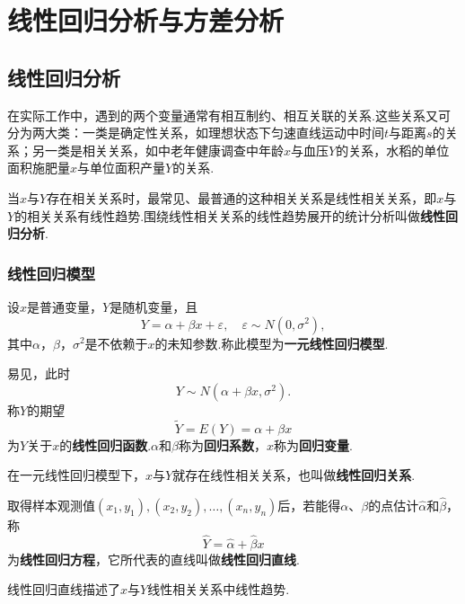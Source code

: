 \chapter{线性回归分析与方差分析}
\section{线性回归分析}
在实际工作中，遇到的两个变量通常有相互制约、相互关联的关系.这些关系又可分为两大类：一类是确定性关系，如理想状态下匀速直线运动中时间\(t\)与距离\(s\)的关系；另一类是相关关系，如中老年健康调查中年龄\(x\)与血压\(Y\)的关系，水稻的单位面积施肥量\(x\)与单位面积产量\(Y\)的关系.

当\(x\)与\(Y\)存在相关关系时，最常见、最普通的这种相关关系是线性相关关系，即\(x\)与\(Y\)的相关关系有线性趋势.围绕线性相关关系的线性趋势展开的统计分析叫做\textbf{线性回归分析}.

\subsection{线性回归模型}
\begin{definition}
设\(x\)是普通变量，\(Y\)是随机变量，且\[
Y = \alpha + \beta x + \varepsilon,
\quad \varepsilon \sim N(0,\sigma^2),
\]其中\(\alpha\)，\(\beta\)，\(\sigma^2\)是不依赖于\(x\)的未知参数.称此模型为\textbf{一元线性回归模型}.

易见，此时\[
Y \sim N(\alpha + \beta x,\sigma^2).
\]称\(Y\)的期望\[
\tilde{Y} = E(Y) = \alpha + \beta x
\]为\(Y\)关于\(x\)的\textbf{线性回归函数}.\(\alpha\)和\(\beta\)称为\textbf{回归系数}，\(x\)称为\textbf{回归变量}.

在一元线性回归模型下，\(x\)与\(Y\)就存在线性相关关系，也叫做\textbf{线性回归关系}.

取得样本观测值\((x_1,y_1),(x_2,y_2),\dotsc,(x_n,y_n)\)后，若能得\(\alpha\)、\(\beta\)的点估计\(\hat{\alpha}\)和\(\hat{\beta}\)，称\[
\hat{Y} = \hat{\alpha} + \hat{\beta} x
\]为\textbf{线性回归方程}，它所代表的直线叫做\textbf{线性回归直线}.
\end{definition}
线性回归直线描述了\(x\)与\(Y\)线性相关关系中线性趋势.

